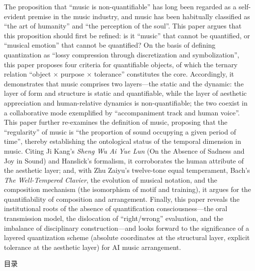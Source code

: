 \documentclass[11pt,a4paper,fontset=none]{ctexart}
\begin{document}
\begin{英文摘要}
The proposition that ``music is non-quantifiable'' has long been regarded as a self-evident
premise in the music industry, and music has been habitually classified as ``the art of humanity''
and ``the perception of the soul''. This paper argues that this proposition should first be
refined: is it ``music'' that cannot be quantified, or ``musical emotion'' that cannot be
quantified? On the basis of defining quantization as ``lossy compression through discretization
and symbolization'', this paper proposes four criteria for quantifiable objects, of which the
ternary relation ``object $\times$ purpose $\times$ tolerance'' constitutes the core. Accordingly,
it demonstrates that music comprises two layers---the static and the dynamic: the layer of form
and structure is static and quantifiable, while the layer of aesthetic appreciation and
human-relative dynamics is non-quantifiable; the two coexist in a collaborative mode exemplified
by ``accompaniment track and human voice''. This paper further re-examines the definition of
music, proposing that the ``regularity'' of music is ``the proportion of sound occupying a given
period of time'', thereby establishing the ontological status of the temporal dimension in music.
Citing Ji Kang's \textit{Sheng Wu Ai Yue Lun} (On the Absence of Sadness and Joy in Sound) and
Hanslick's formalism, it corroborates the human attribute of the aesthetic layer; and, with Zhu
Zaiyu's twelve-tone equal temperament, Bach's \textit{The Well-Tempered Clavier}, the evolution of
musical notation, and the composition mechanism (the isomorphism of motif and training), it argues
for the quantifiability of composition and arrangement. Finally, this paper reveals the
institutional roots of the absence of quantification consciousness---the oral transmission model,
the dislocation of ``right/wrong'' evaluation, and the imbalance of disciplinary construction---and
looks forward to the significance of a layered quantization scheme (absolute coordinates at the
structural layer, explicit tolerance at the aesthetic layer) for AI music arrangement.
\end{英文摘要}


\newpage
{\sffamily\bfseries\fontsize{14}{17}\selectfont
 \begin{center}目\quad 录\end{center}}
\vspace{0.6em}
\renewcommand{\contentsname}{}
\vspace{-3.2em}
\tableofcontents
\newpage
\end{document}
